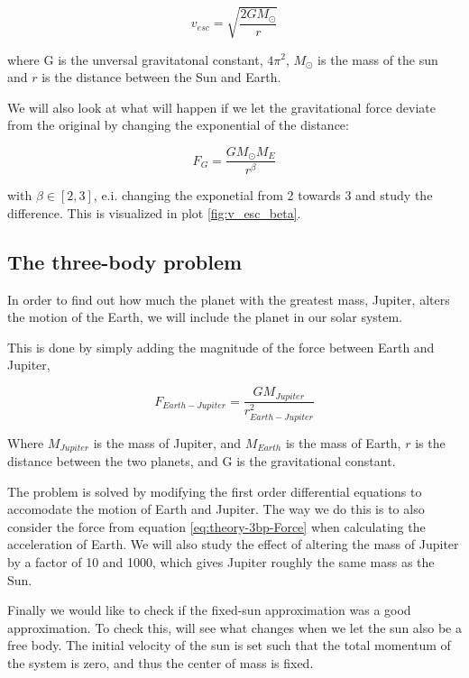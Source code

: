 \documentclass[../main.tex]{subfiles}
\begin{document}
\begin{equation}\label{eq:escapevelocity}
  v_{esc} = \sqrt{\frac{2GM_\odot}{r}}
\end{equation}

where G is the unversal gravitatonal constant, $4 \pi^2$, $M_\odot$ is the mass of the sun and $r$ is the distance between the Sun and Earth.

We will also look at what will happen if we let the gravitational force deviate from the original by changing the exponential of the distance:

$$F_G = \frac{GM_\odot M_E}{r^{\beta}}$$

with $\beta \in [2,3]$, e.i. changing the exponetial from 2 towards 3 and study the difference. This is visualized in plot \ref{fig:v_esc_beta}.

\subsection{The three-body problem}
In order to find out how much the planet with the greatest mass, Jupiter, alters the motion of the Earth, we will include the planet in our solar system.

This is done by simply adding the magnitude of the force between Earth and Jupiter,

\begin{equation}
  F_{Earth-Jupiter} = \frac{GM_{Jupiter}}{r^2_{Earth-Jupiter}} \label{eq:theory-3bp-Force}
\end{equation}

Where $M_{Jupiter}$ is the mass of Jupiter, and $M_{Earth}$ is the mass of Earth, $r$ is the distance between the two planets, and G is the gravitational constant.

The problem is solved by modifying the first order differential equations to accomodate the motion of Earth and Jupiter. The way we do this is to also consider the force from equation \eqref{eq:theory-3bp-Force} when calculating the acceleration of Earth. We will also study the effect of altering the mass of Jupiter by a factor of 10 and 1000, which gives Jupiter roughly the same mass as the Sun.

Finally we would like to check if the fixed-sun approximation was a good approximation. To check this, will see what changes when we let the sun also be a free body. The initial velocity of the sun is set such that the total momentum of the system is zero, and thus the center of mass is fixed.
\end{document}
